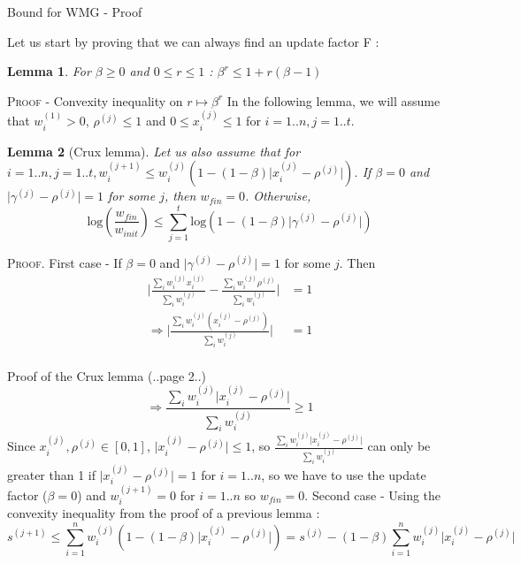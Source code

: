 \documentclass{beamer}
\newtheorem{Lm}{Lemma}
\begin{document}
\begin{frame}{Bound for WMG - Proof}

Let us start by proving that we can always find an update factor F :
\begin{Lm}
For $\beta \geq 0$ and $0 \leq r \leq 1$ : $\beta^r\leq 1 + r(\beta - 1)$
\end{Lm}
\textsc{Proof} - Convexity inequality on $r \mapsto \beta^r$\newline
In the following lemma, we will assume that $w_i^{(1)}>0$, $\rho^{(j)}\leq 1$ and $0\leq x_i^{(j)}\leq 1$ for $i=1..n, j=1..t$. 

\end{frame}

\begin{frame}

\begin{Lm}[Crux lemma]
Let us also assume that for $i=1..n, j=1..t, w_i^{(j+1)}\leq w_i^{(j)}(1-(1-\beta)\lvert x_i^{(j)}-\rho^{(j)}\rvert)$. If $\beta=0$ and $\lvert \gamma^{(j)}-\rho^{(j)}\rvert=1$ for some $j$, then $w_{fin} = 0$. Otherwise,
\[\mathrm{log}(\frac{w_{fin}}{w_{init}})\leq\sum_{j=1}^{t}\mathrm{log}(1-(1-\beta)\lvert \gamma^{(j)}-\rho^{(j)}\rvert)\]
\end{Lm}
\textsc{Proof}.\newline
First case - If $\beta=0$ and $\lvert \gamma^{(j)}-\rho^{(j)}\rvert=1$ for some $j$. Then 
\begin{align*}
\lvert \frac{\sum_i w_i^{(j)}x_i^{(j)}}{\sum_i w_i^{(j)}} - \frac{\sum_i w_i^{(j)}\rho^{(j)}}{\sum_i w_i^{(j)}} \rvert &= 1\\
\Rightarrow\lvert \frac{\sum_i w_i^{(j)}(x_i^{(j)} - \rho^{(j)})}{\sum_i w_i^{(j)}} \rvert &= 1\\
\end{align*}

\end{frame}

\begin{frame}{Proof of the Crux lemma (..page 2..)}
\[\Rightarrow\frac{\sum_i w_i^{(j)}\lvert x_i^{(j)} - \rho^{(j)}\rvert}{\sum_i w_i^{(j)}} \geq 1\]
Since $x_i^{(j)}, \rho^{(j)}\in [0,1]$, $\lvert x_i^{(j)} - \rho^{(j)} \rvert \leq 1$, so $\frac{\sum_i w_i^{(j)}\lvert x_i^{(j)} - \rho^{(j)}\rvert}{\sum_i w_i^{(j)}}$ can only be greater than 1 if $\lvert x_i^{(j)} - \rho^{(j)} \rvert = 1$ for $i=1..n$, so we have to use the update factor ($\beta = 0$) and $w_i^{(j+1)} = 0$ for $i = 1..n$ so $w_{fin} = 0$. \newline \newline
Second case - Using the convexity inequality from the proof of a previous lemma :
\[s^{(j+1)}\leq\sum_{i=1}^{n} w_i^{(j)}(1-(1-\beta)\lvert x_i^{(j)}-\rho^{(j)}\rvert) = s^{(j)} - (1 - \beta)\sum_{i=1}^{n} w_i^{(j)}\lvert x_i^{(j)}-\rho^{(j)}\rvert\]

\end{frame}
\end{document}
